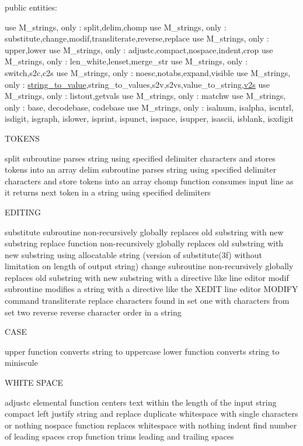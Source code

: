public entities\+:

use M\+\_\+strings, only \+: split,delim,chomp use M\+\_\+strings, only \+: substitute,change,modif,transliterate,reverse,replace use M\+\_\+strings, only \+: upper,lower use M\+\_\+strings, only \+: adjustc,compact,nospace,indent,crop use M\+\_\+strings, only \+: len\+\_\+white,lenset,merge\+\_\+str use M\+\_\+strings, only \+: switch,s2c,c2s use M\+\_\+strings, only \+: noesc,notabs,expand,visible use M\+\_\+strings, only \+: \hyperlink{interfacem__strings_1_1string__to__value}{string\+\_\+to\+\_\+value},string\+\_\+to\+\_\+values,s2v,s2vs,value\+\_\+to\+\_\+string,\hyperlink{interfacem__strings_1_1v2s}{v2s} use M\+\_\+strings, only \+: listout,getvals use M\+\_\+strings, only \+: matchw use M\+\_\+strings, only \+: base, decodebase, codebase use M\+\_\+strings, only \+: isalnum, isalpha, iscntrl, isdigit, isgraph, islower, isprint, ispunct, isspace, isupper, isascii, isblank, isxdigit

T\+O\+K\+E\+NS

split subroutine parses string using specified delimiter characters and stores tokens into an array delim subroutine parses string using specified delimiter characters and store tokens into an array chomp function consumes input line as it returns next token in a string using specified delimiters

E\+D\+I\+T\+I\+NG

substitute subroutine non-\/recursively globally replaces old substring with new substring replace function non-\/recursively globally replaces old substring with new substring using allocatable string (version of substitute(3f) without limitation on length of output string) change subroutine non-\/recursively globally replaces old substring with new substring with a directive like line editor modif subroutine modifies a string with a directive like the X\+E\+D\+IT line editor M\+O\+D\+I\+FY command transliterate replace characters found in set one with characters from set two reverse reverse character order in a string

C\+A\+SE

upper function converts string to uppercase lower function converts string to miniscule

W\+H\+I\+TE S\+P\+A\+CE

adjustc elemental function centers text within the length of the input string compact left justify string and replace duplicate whitespace with single characters or nothing nospace function replaces whitespace with nothing indent find number of leading spaces crop function trims leading and trailing spaces

